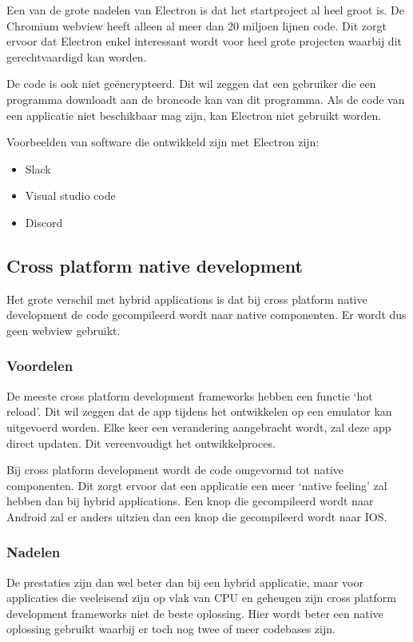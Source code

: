 		Een van de grote nadelen van Electron is dat het startproject al heel groot is. De Chromium webview heeft alleen al meer dan 20 miljoen lijnen code. Dit zorgt ervoor dat Electron enkel interessant wordt voor heel grote projecten waarbij dit gerechtvaardigd kan worden.
		
		De code is ook niet geëncrypteerd. Dit wil zeggen dat een gebruiker die een programma downloadt aan de broncode kan van dit programma. Als de code van een applicatie niet beschikbaar mag zijn, kan Electron niet gebruikt worden.
		
		Voorbeelden van software die ontwikkeld zijn met Electron zijn:
		\begin{itemize}
			\item	Slack
			\item	Visual studio code
			\item	Discord
		\end{itemize}
 

\subsection{Cross platform native development}
Het grote verschil met hybrid applications is dat bij cross platform native development de code gecompileerd wordt naar native componenten. Er wordt dus geen webview gebruikt.
\autocite{Ghinea2018}
\autocite{DeConinck2019}

	\subsubsection{Voordelen}
		De meeste cross platform development frameworks hebben een functie ‘hot reload’. Dit wil zeggen dat de app tijdens het ontwikkelen op een emulator kan uitgevoerd worden. Elke keer een verandering aangebracht wordt, zal deze app direct updaten. Dit vereenvoudigt het ontwikkelproces. 
		
		Bij cross platform development wordt de code omgevormd tot native componenten. Dit zorgt ervoor dat een applicatie een meer ‘native feeling’ zal hebben dan bij hybrid applications. Een knop die gecompileerd wordt naar Android zal er anders uitzien dan een knop die gecompileerd wordt naar IOS.
		\autocite{Asp2017}
	
	\subsubsection{Nadelen}
		De prestaties zijn dan wel beter dan bij een hybrid applicatie, maar voor applicaties die veeleisend zijn op vlak van CPU en geheugen zijn cross platform development frameworks niet de beste oplossing. Hier wordt beter een native oplossing gebruikt waarbij er toch nog twee of meer codebases zijn.
		\autocite{Asp2017}
		
